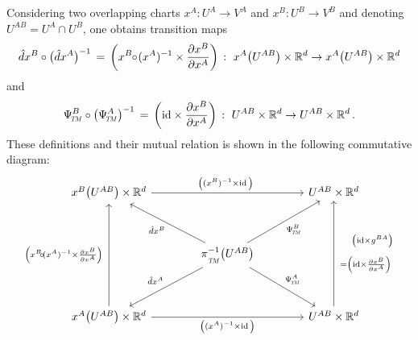Considering two overlapping charts $x^A: U^A \to V^A$ and $x^B: U^B \to V^B$ and denoting $U^{AB} = U^A \cap U^B$, one obtains transition maps
\begin{align}
    \hat{d}x^B \circ \big( \hat{d}x^A \big)^{-1} \,=\,
    \left( x^B \mkern-5mu\circ\mkern-3mu (x^A)^{-1} \times \frac{\partial x^B}{\partial x^A} \right)
    \,:\ x^A\big( U^{AB}\big) \times \mathbb{R}^d \to x^A\big( U^{AB}\big) \times \mathbb{R}^d
\end{align}
and
\begin{align}
    \PsiTM^B \circ \big( \PsiTM^A \big)^{-1} \,=\,
    \left( \id \times \frac{\partial x^B}{\partial x^A} \right)
    \,:\ U^{AB} \times \R^d \to U^{AB} \times \R^d \,.
\end{align}
These definitions and their mutual relation is shown in the following commutative diagram:
\begin{equation}\label{cd:coordinate_basis_bundle_trivialization_transition}
    \begin{tikzcd}[row sep=3.5em, column sep=4em]
        x^B\big(U^{AB}\big) \times \R^d
            \arrow[rr, "\big( (x^B)^{-1} \times \id \,\big)\ "]
        & &
        U^{AB} \times \R^d
        \\
        &
        \piTM^{-1}\big(U^{AB}\big)
            \arrow[ul, "\hat{d}x^B"]
            \arrow[dl, "\hat{d}x^A"']
            \arrow[ur, "\PsiTM^B"']
            \arrow[dr, "\PsiTM^A"]
        \\
        x^A\big(U^{AB}\big) \times \R^d
            \arrow[rr, "\big( (x^A)^{-1} \times \id \,\big)"']
            \arrow[uu, "\pig( x^B \mkern-5mu\circ\mkern-3mu (x^A)^{-1} \times \frac{\partial x^B}{\partial x^A} \pig)\ "]
        &&
        U^{AB} \times \R^d
            \arrow[uu, "
                    \hspace*{10pt}
                    $\big(\id \times g^{BA} \big)$
                    \\ \rule{0pt}{16pt}
                    $ = \pig( \id \times \frac{\partial x^B}{\partial x^A} \pig)$
                    "' align = left]
    \end{tikzcd}
\end{equation}




















